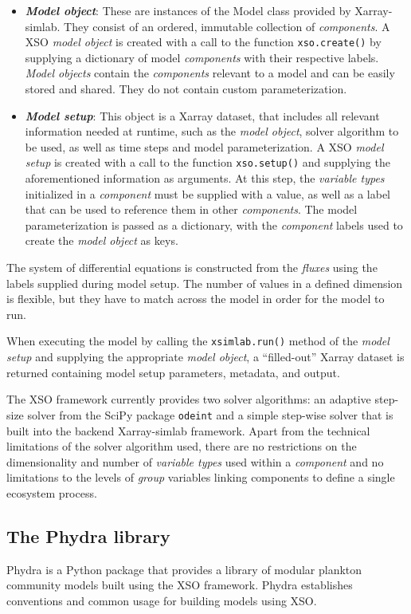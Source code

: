 \documentclass[journal abbreviation, manuscript]{copernicus}
\begin{document}
\begin{itemize}
    \item \textbf{\textit{Model object}}: These are instances of the Model class provided by Xarray-simlab. They consist of an ordered, immutable collection of \textit{components}. A XSO \textit{model object} is created with a call to the function \texttt{xso.create()} by supplying a dictionary of model \textit{components} with their respective labels. \textit{Model objects} contain the \textit{components} relevant to a model and can be easily stored and shared. They do not contain custom parameterization.

   \item \textbf{\textit{Model setup}}: This object is a Xarray dataset, that includes all relevant information needed at runtime, such as the \textit{model object}, solver algorithm to be used, as well as time steps and model parameterization. A XSO \textit{model setup} is created with a call to the function \texttt{xso.setup()} and supplying the aforementioned information as arguments. At this step, the \textit{variable types} initialized in a \textit{component} must be supplied with a value, as well as a label that can be used to reference them in other \textit{components}. The model parameterization is passed as a dictionary, with the \textit{component} labels used to create the \textit{model object} as keys.
\end{itemize}

The system of differential equations is constructed from the \textit{fluxes} using the labels supplied during model setup. The number of values in a defined dimension is flexible, but they have to match across the model in order for the model to run. 

When executing the model by calling the \texttt{xsimlab.run()} method of the \textit{model setup} and supplying the appropriate \textit{model object}, a “filled-out” Xarray dataset is returned containing model setup parameters, metadata, and output.

The XSO framework currently provides two solver algorithms: an adaptive step-size solver from the SciPy package \texttt{odeint} and a simple step-wise solver that is built into the backend Xarray-simlab framework. Apart from the technical limitations of the solver algorithm used, there are no restrictions on the dimensionality and number of \textit{variable types} used within a \textit{component} and no limitations to the levels of \textit{group} variables linking components to define a single ecosystem process. 

\subsection{The Phydra library} \label{Section:PhydraLibrary}
Phydra is a Python package that provides a library of modular plankton community models built using the XSO framework. Phydra establishes conventions and common usage for building models using XSO.
\end{document}
